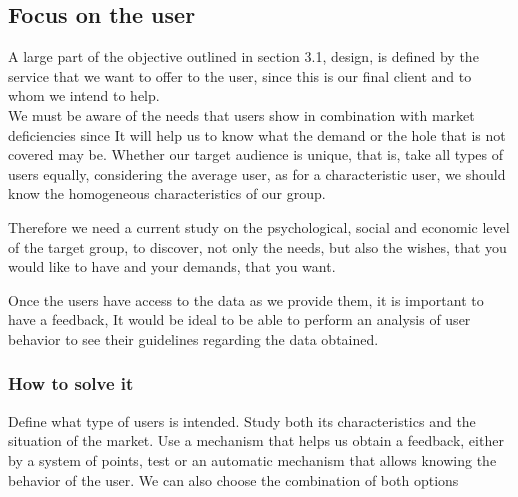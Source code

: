 \subsection{Focus on the user}
A large part of the objective outlined in section 3.1, design, is defined by the service that we want to offer
to the user, since this is our final client and to whom we intend to help. \\


We must be aware of the needs that users show in combination with market deficiencies since
It will help us to know what the demand or the hole that is not covered may be.
Whether our target audience is unique, that is, take all types of users equally, considering the
average user, as for a characteristic user, we should know the homogeneous characteristics of our group.

Therefore we need a current study on the psychological, social and economic level of the target group, to discover, not only
the needs, but also the wishes, that you would like to have and your demands, that you want.

Once the users have access to the data as we provide them, it is important to have a feedback,
It would be ideal to be able to perform an analysis of user behavior to see their guidelines regarding the data obtained.
\subsubsection{How to solve it} 
Define what type of users is intended. Study both its characteristics and the situation of the
market.
Use a mechanism that helps us obtain a feedback, either by a system of points, test or
an automatic mechanism that allows knowing the behavior of the user. We can also choose the combination of both
options

